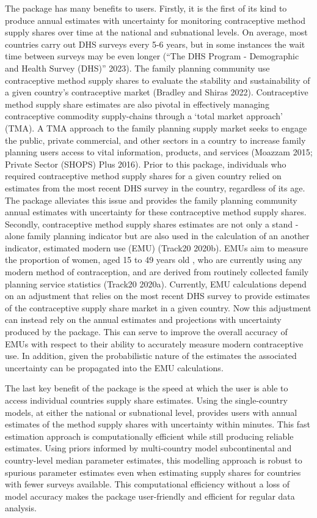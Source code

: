 The  package has many benefits to users. Firstly, it is the first of its kind to produce annual estimates with uncertainty for monitoring contraceptive method supply shares over time at the national and subnational levels. On average, most countries carry out DHS surveys every 5-6 years, but in some instances the wait time between surveys may be even longer ({``{The DHS Program - Demographic and Health Survey (DHS)}''} 2023). The family planning community use contraceptive method supply shares to evaluate the stability and sustainability of a given country's contraceptive market (Bradley and Shiras 2022). Contraceptive method supply share estimates are also pivotal in effectively managing contraceptive commodity supply-chains through a `total market approach' (TMA). A TMA approach to the family planning supply market seeks to engage the public, private commercial, and other sectors in a country to increase family planning users access to vital information, products, and services (Moazzam 2015; Private Sector (SHOPS) Plus 2016). Prior to this package, individuals who required contraceptive method supply shares for a given country relied on estimates from the most recent DHS survey in the country, regardless of its age. The  package alleviates this issue and provides the family planning community annual estimates with uncertainty for these contraceptive method supply shares. Secondly, contraceptive method supply shares estimates are not only a stand -alone family planning indicator but are also used in the calculation of an another indicator, estimated modern use (EMU) (Track20 2020b). EMUs aim to measure the proportion of women, aged 15 to 49 years old , who are currently using any modern method of contraception, and are derived from routinely collected family planning service statistics (Track20 2020a). Currently, EMU calculations depend on an adjustment that relies on the most recent DHS survey to provide estimates of the contraceptive supply share market in a given country. Now this adjustment can instead rely on the annual estimates and projections with uncertainty produced by the  package. This can serve to improve the overall accuracy of EMUs with respect to their ability to accurately measure modern contraceptive use. In addition, given the probabilistic nature of the  estimates the associated uncertainty can be propagated into the EMU calculations.

The last key benefit of the  package is the speed at which the user is able to access individual countries supply share estimates. Using the single-country models, at either the national or subnational level, provides users with annual estimates of the method supply shares with uncertainty within minutes. This fast estimation approach is computationally efficient while still producing reliable estimates. Using priors informed by multi-country model subcontinental and country-level median parameter estimates, this modelling approach is robust to spurious parameter estimates even when estimating supply shares for countries with fewer surveys available. This computational efficiency without a loss of model accuracy makes the  package user-friendly and efficient for regular data analysis.

